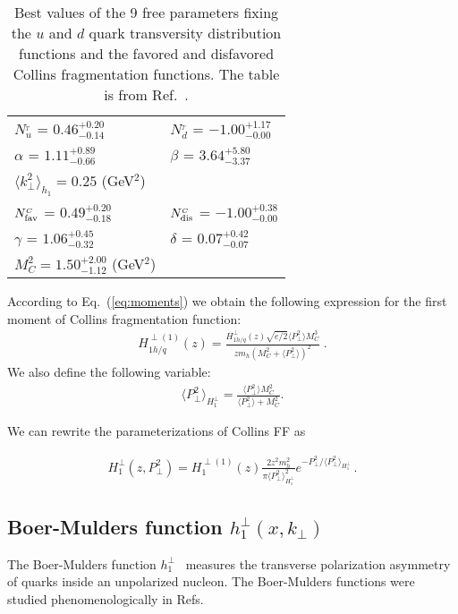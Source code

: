 \documentclass[a4paper,11pt]{article}
\newcommand{\ba}{\begin{eqnarray}}
\newcommand{\ea}{\end{eqnarray}}
\newcommand{\la}{\langle}
\newcommand{\ra}{\rangle}
\def\T{_{_T}}
\def\C{_{_C}}
\def\kperp{k_\perp}
\def\pperp{P_\perp}
\def\avkperp{\la \kperp^2 \ra}
\def\avpperp{\la \pperp^2 \ra}
\begin{document}
\begin{table}[h]
\centering
\renewcommand{\tabcolsep}{0.4pc} %
\renewcommand{\arraystretch}{1.2} %
\begin{tabular}{@{ }ll}
 \hline
 $N_{u}^{\T}$ = $0.46^{+0.20}_{-0.14}$ & $N_{d}^{\T}$ = $ -1.00^{+1.17}_{-0.00}$ \\
 $\alpha$ =  $1.11^{+0.89}_{-0.66}$ & $\beta$  = $3.64^{+5.80}_{-3.37}$ \\
 $\avkperp_{h_1} = 0.25$ (GeV$^2$) & \\
 \hline
 $N_{\rm fav}^{\C}$  = $0.49^{+0.20}_{-0.18}$ & $N_{\rm dis}^{\C}$  = 
 $-1.00^{+0.38}_{-0.00}$ \\
 $\gamma$  = $1.06^{+0.45}_{-0.32}$  & $\delta$   = $0.07^{+0.42}_{-0.07}$    \\
 $M^2_C = 1.50^{+2.00}_{-1.12}$ (GeV$^2$) & \\
 \hline
\end{tabular}
\caption{
Best values of the 9 free parameters fixing the $u$ and $d$ quark
transversity distribution functions and the favored and
disfavored Collins fragmentation functions. The table is from Ref.~\cite{Anselmino:2013vqa}.
\label{fitpar}}
\end{table}


According to Eq.~(\ref{eq:moments}) we obtain the following expression for the first moment of 
Collins fragmentation function: 
\ba
H_{1 h/q}^{\perp (1)}(z) = \frac{H_{1 h/q}^{\perp}(z) \sqrt{e/2}  \avpperp M_C^3}{z m_h  (M_C^2+\avpperp)^2}\; .
\ea 
We also define the following variable:
\ba
\avpperp_{H_1^\perp} = \frac{\avpperp M_C^2 }{\avpperp + M_C^2} .  
\ea

We can rewrite the parameterizations of Collins FF as

\ba
H_{1}^{\perp}(z,\pperp^2) =  H_{1}^{\perp (1)}(z)   \frac{2 z^2 m_h^2}{\pi \avpperp_{H_{1}^\perp}^2} e^{-\pperp^2/{\avpperp_{H_{1}^\perp}}}
\label{coll-funct_new} \, .
\ea

\subsection{\boldmath Boer-Mulders function $h_{1}^{\perp}(x,k_\perp)$} 
\label{App:basis-h1perp}

The Boer-Mulders function $h_{1}^{\perp}$~\cite{Boer:1997nt} measures 
the transverse polarization asymmetry of quarks inside an unpolarized 
nucleon. The Boer-Mulders functions were studied phenomenologically in 
Refs.~\cite{Barone:2009hw,Barone:2010gk,Barone:2015ksa}
\end{document}
